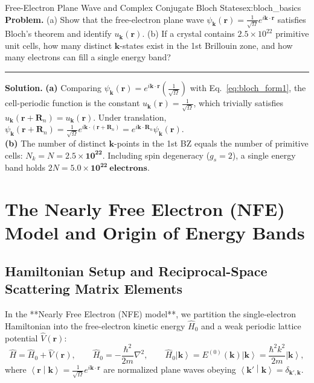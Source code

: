 \documentclass[11pt,a4paper]{article}
\newcommand{\ket}[1]{\left|#1\right\rangle}
\newcommand{\braket}[2]{\left\langle #1 \middle| #2 \right\rangle}
\newcommand{\hb}{\hbar}
\newcommand{\hbarsq}{\hb^2}
\newcommand{\kk}{\mathbf{k}}
\newcommand{\kpvec}{\mathbf{k}'}
\newcommand{\RR}{\mathbf{R}}
\newcommand{\rvec}{\mathbf{r}}
\newcommand{\Ebare}{E^{(0)}}
\begin{document}
\begin{examplebox}{Free-Electron Plane Wave and Complex Conjugate Bloch States}{ex:bloch_basics}
\textbf{Problem.} (a) Show that the free-electron plane wave $\psi_{\kk}(\rvec) = \frac{1}{\sqrt{\Omega}}e^{i\kk\cdot\rvec}$ satisfies Bloch's theorem and identify $u_{\kk}(\rvec)$. (b) If a crystal contains $2.5 \times 10^{22}$ primitive unit cells, how many distinct $\kk$-states exist in the 1st Brillouin zone, and how many electrons can fill a single energy band?
\vspace{0.2cm}\hrule\vspace{0.2cm}
\textbf{Solution.}
\textbf{(a)} Comparing $\psi_{\kk}(\rvec) = e^{i\kk\cdot\rvec}\left(\frac{1}{\sqrt{\Omega}}\right)$ with Eq.~\eqref{eq:bloch_form1}, the cell-periodic function is the constant $u_{\kk}(\rvec) = \frac{1}{\sqrt{\Omega}}$, which trivially satisfies $u_{\kk}(\rvec + \RR_n) = u_{\kk}(\rvec)$. Under translation, $\psi_{\kk}(\rvec + \RR_n) = \frac{1}{\sqrt{\Omega}}e^{i\kk\cdot(\rvec+\RR_n)} = e^{i\kk\cdot\RR_n}\psi_{\kk}(\rvec)$.\\
\textbf{(b)} The number of distinct $\kk$-points in the 1st BZ equals the number of primitive cells: $N_k = N = \mathbf{2.5 \times 10^{22}}$. Including spin degeneracy ($g_s = 2$), a single energy band holds $2N = \mathbf{5.0 \times 10^{22}\ \text{electrons}}$.
\end{examplebox}

\section{The Nearly Free Electron (NFE) Model and Origin of Energy Bands}
\label{sec:nfe}

\subsection{Hamiltonian Setup and Reciprocal-Space Scattering Matrix Elements}
In the **Nearly Free Electron (NFE) model**, we partition the single-electron Hamiltonian into the free-electron kinetic energy $\hat{H}_0$ and a weak periodic lattice potential $\hat{V}(\rvec)$:
\begin{equation}
    \hat{H} = \hat{H}_0 + \hat{V}(\rvec), \qquad \hat{H}_0 = -\frac{\hbarsq}{2m}\nabla^2, \qquad \hat{H}_0\ket{\kk} = \Ebare(\kk)\ket{\kk} = \frac{\hbarsq k^2}{2m}\ket{\kk},
\end{equation}
where $\braket{\rvec}{\kk} = \frac{1}{\sqrt{\Omega}}e^{i\kk\cdot\rvec}$ are normalized plane waves obeying $\braket{\kpvec}{\kk} = \delta_{\kpvec,\kk}$.
\end{document}
